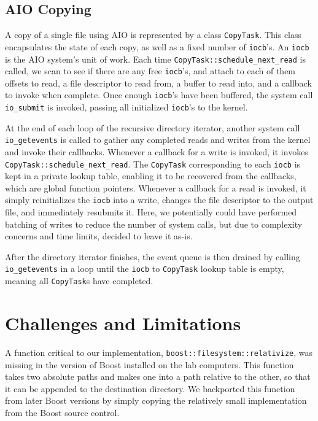 \documentclass[11pt]{article}
\begin{document}
\subsection{AIO Copying}
A copy of a single file using AIO is represented by a class \texttt{CopyTask}. This class encapsulates the state of each copy, as well as a fixed number of  \texttt{iocb}'s. An \texttt{iocb} is the AIO system's unit of work. Each time \texttt{CopyTask::schedule\_next\_read} is called, we scan to see if there are any free \texttt{iocb}'s, and attach to each of them offsets to read, a file descriptor to read from, a buffer to read into, and a callback to invoke when complete. Once enough \texttt{iocb}'s have been buffered, the system call \texttt{io\_submit} is invoked, passing all initialized \texttt{iocb}'s to the kernel. 

At the end of each loop of the recursive directory iterator, another system call \texttt{io\_getevents} is called to gather any completed reads and writes from the kernel and invoke their callbacks. Whenever a callback for a write is invoked, it invokes \texttt{CopyTask::schedule\_next\_read}. The \texttt{CopyTask} corresponding to each \texttt{iocb} is kept in a private lookup table, enabling it to be recovered from the callbacks, which are global function pointers. Whenever a callback for a read is invoked, it simply reinitializes the \texttt{iocb} into a write, changes the file descriptor to the output file, and immediately resubmits it. Here, we potentially could have performed batching of writes to reduce the number of system calls, but due to complexity concerns and time limits, decided to leave it as-is.

After the directory iterator finishes, the event queue is then drained by calling \texttt{io\_getevents} in a loop until the \texttt{iocb} to \texttt{CopyTask} lookup table is empty, meaning all \texttt{CopyTask}s have completed.

\section{Challenges and Limitations}
A function critical to our implementation,
\texttt{boost::filesystem::relativize}, was missing in the version of Boost
installed on the lab computers. This function takes two absolute paths and makes
one into a path relative to the other, so that it can be appended to the
destination directory. We backported this function from later Boost versions by
simply copying the relatively small implementation from the Boost source
control.
\end{document}
